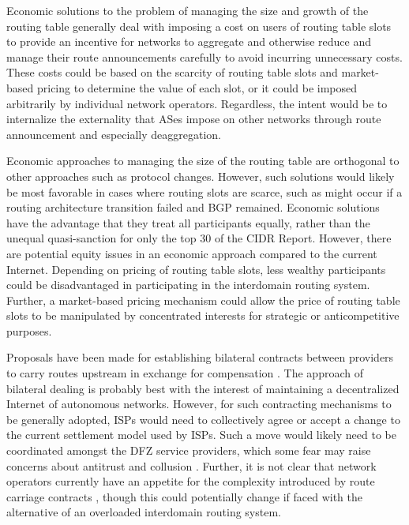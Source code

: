 Economic solutions to the problem of managing the size and growth of the
routing table generally deal with imposing a cost on users of routing table
slots to provide an incentive for networks to aggregate and otherwise reduce
and manage their route announcements carefully to avoid incurring unnecessary
costs. These costs could be based on the scarcity of routing table slots and
market-based pricing to determine the value of each slot, or it could be
imposed arbitrarily by individual network operators. Regardless, the intent
would be to internalize the externality that ASes impose on other networks
through route announcement and especially deaggregation.

Economic approaches to managing the size of the routing table are orthogonal to
other approaches such as protocol changes. However, such solutions would likely
be most favorable in cases where routing slots are scarce, such as might occur
if a routing architecture transition failed and BGP remained. Economic
solutions have the advantage that they treat all participants equally, rather
than the unequal quasi-sanction for only the top 30 of the CIDR Report.
However, there are potential equity issues in an economic approach compared to
the current Internet. Depending on pricing of routing table slots, less wealthy
participants could be disadvantaged in participating in the interdomain routing
system. Further, a market-based pricing mechanism could allow the price of
routing table slots to be manipulated by concentrated interests for strategic
or anticompetitive purposes.

Proposals have been made for establishing bilateral contracts between providers
to carry routes upstream in exchange for compensation \cite{Rekhter:1997mi}.
The approach of bilateral dealing is probably best with the interest of
maintaining a decentralized Internet of autonomous networks.  However, for such
contracting mechanisms to be generally adopted, ISPs would need to collectively
agree or accept a change to the current settlement model used by ISPs. Such a
move would likely need to be coordinated amongst the DFZ service providers,
which some fear may raise concerns about antitrust and collusion
\cite{Li:2011vn}. Further, it is not clear that network operators currently
have an appetite for the complexity introduced by route carriage contracts
\cite{Zhao:2010fu}, though this could potentially change if faced with the
alternative of an overloaded interdomain routing system.



